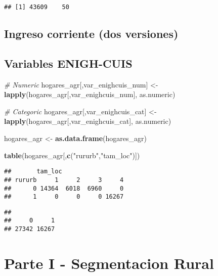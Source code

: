 \documentclass[11pt,]{article}
\newenvironment{Shaded}{\begin{snugshade}}{\end{snugshade}}
\newcommand{\KeywordTok}[1]{\textcolor[rgb]{0.13,0.29,0.53}{\textbf{#1}}}
\newcommand{\StringTok}[1]{\textcolor[rgb]{0.31,0.60,0.02}{#1}}
\newcommand{\CommentTok}[1]{\textcolor[rgb]{0.56,0.35,0.01}{\textit{#1}}}
\newcommand{\OperatorTok}[1]{\textcolor[rgb]{0.81,0.36,0.00}{\textbf{#1}}}
\newcommand{\NormalTok}[1]{#1}
\begin{document}
\begin{verbatim}
## [1] 43609    50
\end{verbatim}

\subsection{Ingreso corriente (dos
versiones)}\label{ingreso-corriente-dos-versiones}

\subsection{Variables ENIGH-CUIS}\label{variables-enigh-cuis}

\begin{Shaded}
\begin{Highlighting}[]
\CommentTok{# Numeric}
\NormalTok{hogares_agr[,var_enighcuis_num] <-}\StringTok{ }\KeywordTok{lapply}\NormalTok{(hogares_agr[,var_enighcuis_num],}
\NormalTok{                                          as.numeric)}

\CommentTok{# Categoric}
\NormalTok{hogares_agr[,var_enighcuis_cat] <-}\StringTok{ }\KeywordTok{lapply}\NormalTok{(hogares_agr[,var_enighcuis_cat],}
\NormalTok{                                          as.numeric)}

\NormalTok{hogares_agr <-}\StringTok{ }\KeywordTok{as.data.frame}\NormalTok{(hogares_agr)}

\KeywordTok{table}\NormalTok{(hogares_agr[,}\KeywordTok{c}\NormalTok{(}\StringTok{"rururb"}\NormalTok{,}\StringTok{"tam_loc"}\NormalTok{)])}
\end{Highlighting}
\end{Shaded}

\begin{verbatim}
##       tam_loc
## rururb     1     2     3     4
##      0 14364  6018  6960     0
##      1     0     0     0 16267
\end{verbatim}

\begin{Shaded}
\end{Shaded}

\begin{verbatim}
## 
##     0     1 
## 27342 16267
\end{verbatim}

\section{Parte I - Segmentacion
Rural}\label{parte-i---segmentacion-rural}
\end{document}

